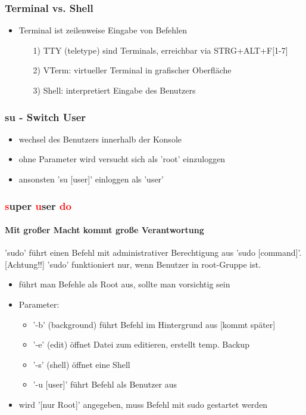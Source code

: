 \documentclass[12pt,utf8]{beamer}
\begin{document}
\begin{frame}
\frametitle{Terminal vs. Shell}
\begin{itemize}
	\item Terminal ist zeilenweise Eingabe von Befehlen
	\begin{itemize}
		\item[1)] TTY (teletype) sind Terminals, erreichbar via STRG+ALT+F[1-7]
		\item[2)] VTerm: virtueller Terminal in grafischer Oberfläche
		\item[3)] Shell: interpretiert Eingabe des Benutzers
	\end{itemize}
\end{itemize}
\end{frame}

\begin{frame}
\frametitle{su - Switch User}
\begin{itemize}
	\item wechsel des Benutzers innerhalb der Konsole
	\item ohne Parameter wird versucht sich als 'root' einzuloggen
	\item ansonsten 'su [user]' einloggen als 'user'
\end{itemize}
\end{frame}

\begin{frame}
\frametitle{\textcolor{red}{s}uper \textcolor{red}{u}ser \textcolor{red}{do}}
\framesubtitle{Mit großer Macht kommt große Verantwortung}
'sudo' führt einen Befehl mit administrativer Berechtigung aus 'sudo [command]'.
[Achtung!!] 'sudo' funktioniert nur, wenn Benutzer in root-Gruppe ist.
\begin{itemize}[<+->]
	\item führt man Befehle als Root aus, sollte man vorsichtig sein
	\item Parameter:
	\begin{itemize}[<+->]
		\item '-b' (background) führt Befehl im Hintergrund aus [kommt später]
		\item '-e' (edit) öffnet Datei zum editieren, erstellt temp. Backup
		\item '-s' (shell) öffnet eine Shell
		\item '-u [user]' führt Befehl als Benutzer aus
	\end{itemize}
	\item wird '[nur Root]' angegeben, muss Befehl mit sudo gestartet werden
\end{itemize}
\end{frame}
\end{document}
